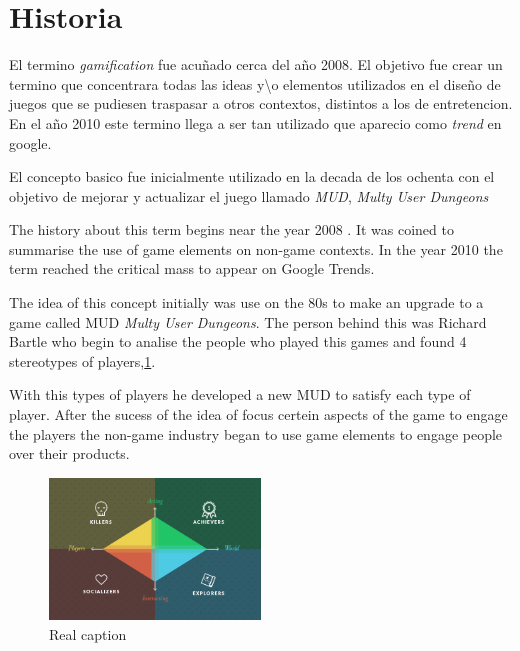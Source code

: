 \section{Historia}

El termino \emph{gamification} fue acuñado cerca del año 2008\cite{DefineGamefication}.
El objetivo fue crear un termino que concentrara todas las ideas y\backslash o elementos utilizados en el 
diseño de juegos que se pudiesen traspasar a otros contextos, distintos a los de entretencion.
En el año 2010 este termino llega a ser tan utilizado que aparecio como \emph{trend}
en google\cite{LiCap1.3}.

El concepto basico fue inicialmente utilizado en la decada de los ochenta con el objetivo
de mejorar y actualizar el juego llamado \emph{MUD}, \emph{Multy User Dungeons}



The history about this term begins near the year 2008 \cite{DefineGamefication}. 
It was coined to summarise the use of game elements on non-game contexts.
In the year 2010 the term reached the critical mass to appear on Google
Trends\cite{LiCap1.3}.

The idea of this concept initially was use on the 80s to make an upgrade to a 
game called MUD \emph{Multy User Dungeons}. The person behind this was Richard Bartle
who begin to analise the people who played this games and found 4 stereotypes of
players,\ref{fig:Players}.

With this types of players he developed a new MUD to satisfy each type of player.
After the sucess of the idea of focus certein aspects of the game to engage the players
the non-game industry began to use game elements to engage people over their products. 

\begin{figure}[!htb]
  \centering
  \includegraphics[width=0.5\textwidth]{images/TypeOfPlayersBartle.png}
  \caption[Caption for LOF]{Real caption\footnotemark}
  \label{fig:Players}
\end{figure}

 	
